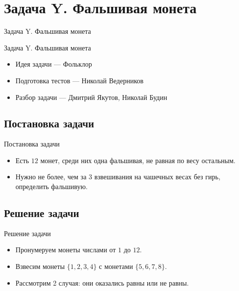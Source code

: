 \section{Задача Y. Фальшивая монета}

\begin{frame}[t]{Задача Y. Фальшивая монета}

  \begin{center}
    \LARGE Задача Y. Фальшивая монета
  \end{center}

  \begin{itemize}
    \item Идея задачи --- Фольклор
    \item Подготовка тестов --- Николай Ведерников
    \item Разбор задачи --- Дмитрий Якутов, Николай Будин
  \end{itemize}
\end{frame}

\subsection{Постановка задачи}

\begin{frame}[t]{Постановка задачи}
\begin{itemize}
    \item Есть $12$ монет, среди них одна фальшивая, не равная по весу остальным.
    \item Нужно не более, чем за $3$ взвешивания на чашечных весах без гирь, определить фальшивую.
\end{itemize}
\end{frame}

\subsection{Решение задачи}

\begin{frame}[t]{Решение задачи}
\begin{itemize}
    \item Пронумеруем монеты числами от $1$ до $12$.
    \item Взвесим монеты $\{1, 2, 3, 4\}$ с монетами $\{5, 6, 7, 8\}$.
    \item Рассмотрим 2 случая: они оказались равны или не равны.
\end{itemize}
\end{frame}

